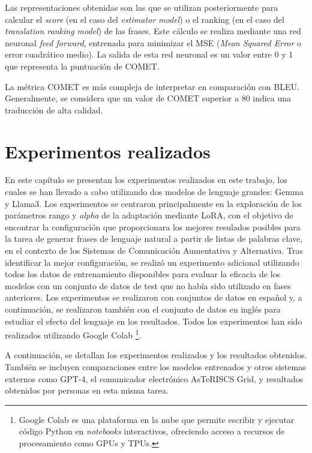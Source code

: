 \documentclass[11pt,spanish,listoffigures,listoftables]{tfgetsinf}
\begin{document}
Las representaciones obtenidas son las que se utilizan posteriormente para calcular el \textit{score} (en el caso del \textit{estimator model}) o el ranking (en el caso del \textit{translation ranking model}) de las frases. Este cálculo se realiza mediante una red neuronal \textit{feed forward}, entrenada para minimizar el MSE (\textit{Mean Squared Error} o error cuadrático medio). La salida de esta red neuronal es un valor entre 0 y 1 que representa la puntuación de COMET.

La métrica COMET es más compleja de interpretar en comparación con BLEU. Generalmente, se considera que un valor de COMET superior a 80 indica una traducción de alta calidad.

\chapter{Experimentos realizados} \label{cap4}

En este capítulo se presentan los experimentos realizados en este trabajo, los cuales se han llevado a cabo utilizando dos modelos de lenguaje grandes: Gemma y Llama3. Los experimentos se centraron principalmente en la exploración de los parámetros rango y \textit{alpha} de la adaptación mediante LoRA, con el objetivo de encontrar la configuración que proporcionara los mejores resulados posibles para la tarea de generar frases de lenguaje natural a partir de listas de palabras clave, en el contexto de los Sistemas de Comunicación Aumentativa y Alternativa. Tras identificar la mejor configuración, se realizó un experimento adicional utilizando todos los datos de entrenamiento disponibles para evaluar la eficacia de los modelos con un conjunto de datos de test que no había sido utilizado en fases anteriores. Los experimentos se realizaron con conjuntos de datos en español y, a continuación, se realizaron también con el conjunto de datos en inglés para estudiar el efecto del lenguaje en los resultados. Todos los experimentos han sido realizados utilizando Google Colab \footnote{Google Colab es una plataforma  en la nube que permite escribir y ejecutar código Python en \textit{notebooks} interactivos, ofreciendo acceso a recursos de procesamiento como GPUs y TPUs.}.

A continuación, se detallan los experimentos realizados y los resultados obtenidos. También se incluyen comparaciones entre los modelos entrenados y otros sistemas externos como GPT-4, el comunicador electrónico AsTeRISCS Grid, y resultados obtenidos por personas en esta misma tarea.
\end{document}
